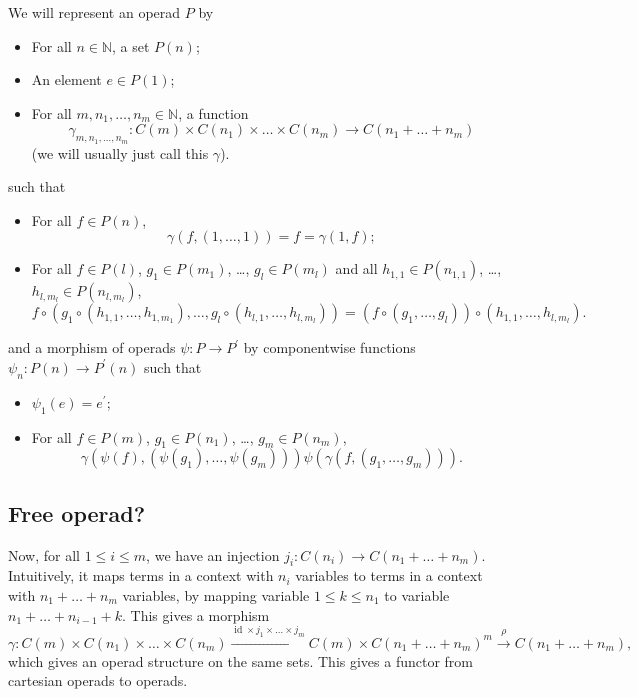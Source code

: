 \documentclass{amsbook}
\theoremstyle{definition}
\begin{document}
  We will represent an operad $ P $ by
  \begin{itemize}
    \item For all $ n \in \mathbb N $, a set $ P(n) $;
    \item An element $ e \in P(1) $;
    \item For all $ m, n_1, \dots, n_m \in \mathbb N $, a function
      \[ \gamma_{m, n_1, \dots, n_m}: C(m) \times C(n_1) \times \dots \times C(n_m) \to C(n_1 + \dots + n_m) \]
      (we will usually just call this $ \gamma $).
  \end{itemize}
  such that
  \begin{itemize}
    \item For all $ f \in P(n) $,
      \[ \gamma(f, (1, \dots, 1)) = f = \gamma(1, f); \]
    \item For all $ f \in P(l) $, $ g_1 \in P(m_1) $, \dots, $ g_l \in P(m_l) $ and all $ h_{1, 1} \in P(n_{1, 1}) $, \dots, $ h_{l, m_l} \in P(n_{l, m_l}) $,
      \[ f \circ(g_1 \circ(h_{1, 1}, \dots, h_{1, m_1}), \dots, g_l \circ (h_{l, 1}, \dots, h_{l, m_l})) = (f \circ (g_1, \dots, g_l)) \circ (h_{1, 1}, \dots, h_{l, m_l}). \]
  \end{itemize}
  and a morphism of operads $ \psi: P \to P^\prime $ by componentwise functions $ \psi_n: P(n) \to P^\prime(n) $ such that
  \begin{itemize}
    \item $ \psi_1(e) = e^\prime $;
    \item For all $ f \in P(m) $, $ g_1 \in P(n_1) $, \dots, $ g_m \in P(n_m) $,
      \[ \gamma(\psi(f), (\psi(g_1), \dots, \psi(g_m)))  \psi(\gamma(f, (g_1, \dots, g_m))). \]
  \end{itemize}

  \subsection{Free operad?}
  Now, for all $ 1 \leq i \leq m $, we have an injection $ j_i: C(n_i) \to C(n_1 + \dots + n_m) $. Intuitively, it maps terms in a context with $ n_i $ variables to terms in a context with $ n_1 + \dots + n_m $ variables, by mapping variable $ 1 \leq k \leq n_1 $ to variable $ n_1 + \dots + n_{i - 1} + k $. This gives a morphism
  \[ \gamma: C(m) \times C(n_1) \times \dots \times C(n_m) \xrightarrow{\mathop{id} \times j_1 \times \dots \times j_m} C(m) \times C(n_1 + \dots + n_m)^m \xrightarrow{\rho} C(n_1 + \dots + n_m), \]
  which gives an operad structure on the same sets. This gives a functor from cartesian operads to operads.
\end{document}
